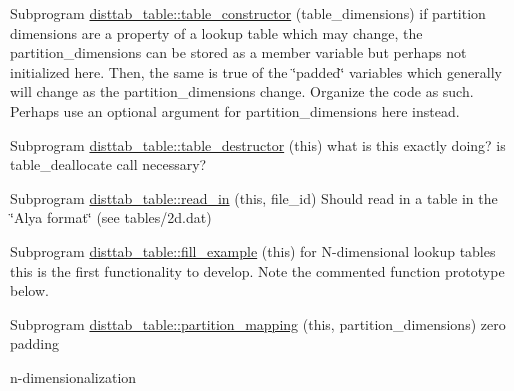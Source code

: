 
\begin{DoxyRefList}
\item[Subprogram \mbox{\hyperlink{namespacedisttab__table_a6b30669a17ed75f6ebac958f890655af}{disttab\+\_\+table\+::table\+\_\+constructor}} (table\+\_\+dimensions)]\label{todo__todo000001}%
%
if partition dimensions are a property of a lookup table which may change, the partition\+\_\+dimensions can be stored as a member variable but perhaps not initialized here. Then, the same is true of the \char`\"{}padded\char`\"{} variables which generally will change as the partition\+\_\+dimensions change. Organize the code as such. Perhaps use an optional argument for partition\+\_\+dimensions here instead.  
\item[Subprogram \mbox{\hyperlink{namespacedisttab__table_a00320b1b054be17b502e8bc01bdfb8cd}{disttab\+\_\+table\+::table\+\_\+destructor}} (this)]\label{todo__todo000002}%
%
what is this exactly doing? is table\+\_\+deallocate call necessary?  
\item[Subprogram \mbox{\hyperlink{namespacedisttab__table_a47c132f14609e77c6bd02ed429aaa515}{disttab\+\_\+table\+::read\+\_\+in}} (this, file\+\_\+id)]\label{todo__todo000003}%
%
Should read in a table in the \char`\"{}\+Alya format\char`\"{} (see tables/2d.\+dat)  
\item[Subprogram \mbox{\hyperlink{namespacedisttab__table_a5ebcbc269c4e666ca0725852783d6d76}{disttab\+\_\+table\+::fill\+\_\+example}} (this)]\label{todo__todo000004}%
%
for N-\/dimensional lookup tables this is the first functionality to develop. Note the commented function prototype below.  
\item[Subprogram \mbox{\hyperlink{namespacedisttab__table_a46780ef5ba062fbd4c874c575f6a3c46}{disttab\+\_\+table\+::partition\+\_\+mapping}} (this, partition\+\_\+dimensions)]\label{todo__todo000005}%
%
zero padding 

n-\/dimensionalization 


\end{DoxyRefList}
